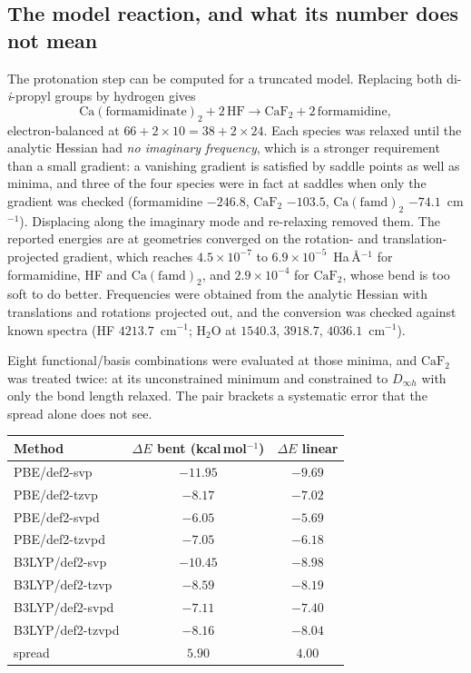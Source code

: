 \documentclass[11pt,a4paper]{article}
\theoremstyle{plain}
\theoremstyle{definition}
\theoremstyle{remark}
\begin{document}
\subsection{The model reaction, and what its number does not mean}

The protonation step can be computed for a truncated model. Replacing both
di-\emph{i}-propyl groups by hydrogen gives
\[
\mathrm{Ca(formamidinate)_2} + 2\,\mathrm{HF}
 \longrightarrow \mathrm{CaF_2} + 2\,\mathrm{formamidine},
\]
electron-balanced at $66 + 2\times10 = 38 + 2\times24$. Each species was relaxed
until the analytic Hessian had \emph{no imaginary frequency}, which is a stronger
requirement than a small gradient: a vanishing gradient is satisfied by saddle
points as well as minima, and three of the four species were in fact at saddles
when only the gradient was checked (formamidine $-246.8$, $\mathrm{CaF_2}$ $-103.5$,
$\mathrm{Ca(famd)_2}$ $-74.1$~cm$^{-1}$). Displacing along the imaginary mode and
re-relaxing removed them. The reported energies are at geometries converged on the
rotation- and translation-projected gradient, which reaches
$4.5\times10^{-7}$ to $6.9\times10^{-5}$~Ha\,\AA$^{-1}$ for formamidine, HF and
$\mathrm{Ca(famd)_2}$, and $2.9\times10^{-4}$ for $\mathrm{CaF_2}$, whose bend is too
soft to do better. Frequencies were obtained from the analytic
Hessian with translations and rotations projected out, and the conversion was
checked against known spectra (HF $4213.7$~cm$^{-1}$; H$_2$O at $1540.3$,
$3918.7$, $4036.1$~cm$^{-1}$).

Eight functional/basis combinations were evaluated at those minima, and
$\mathrm{CaF_2}$ was treated twice: at its unconstrained minimum and constrained to
$D_{\infty h}$ with only the bond length relaxed. The pair brackets a systematic
error that the spread alone does not see.

\begin{center}
\begin{tabular}{lcc}
\hline
Method & $\Delta E$ bent (kcal\,mol$^{-1}$) & $\Delta E$ linear \\
\hline
PBE/def2-svp     & $-11.95$ & $-9.69$ \\
PBE/def2-tzvp    & $-8.17$  & $-7.02$ \\
PBE/def2-svpd    & $-6.05$  & $-5.69$ \\
PBE/def2-tzvpd   & $-7.05$  & $-6.18$ \\
B3LYP/def2-svp   & $-10.45$ & $-8.98$ \\
B3LYP/def2-tzvp  & $-8.59$  & $-8.19$ \\
B3LYP/def2-svpd  & $-7.11$  & $-7.40$ \\
B3LYP/def2-tzvpd & $-8.16$  & $-8.04$ \\
\hline
spread & $5.90$ & $4.00$ \\
\hline
\end{tabular}
\end{center}
\end{document}
